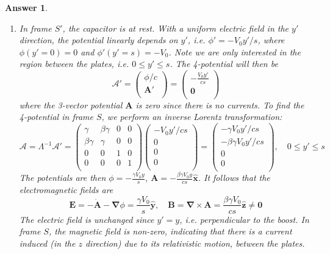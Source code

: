 \documentclass[a4paper]{article}
\newtheorem{ans}{Answer}
\theoremstyle{new}
\begin{document}
\begin{ans}\leavevmode
\begin{enumerate}[label=(\roman*)]
\item In frame $S'$, the capacitor is at rest. With a uniform electric field in the $y'$ direction, the potential linearly depends on $y'$, i.e. $\phi'=-V_0y'/s$, where $\phi(y'=0)=0$ and $\phi'(y'=s)=-V_0$. Note we are only interested in the region between the plates, i.e. $0\leq y'\leq s$. The 4-potential will then be
$$\mathcal{A}'=\begin{pmatrix}\phi/c\\\mathbf{A'}\\\end{pmatrix}=\begin{pmatrix}-\frac{V_0y'}{cs}\\\boldsymbol{0}\\\end{pmatrix}$$
where the 3-vector potential $\mathbf{A}$ is zero since there is no currents. To find the 4-potential in frame $S$, we perform an inverse Lorentz transformation:
$$\mathcal{A}=\Lambda^{-1}\mathcal{A}'=\begin{pmatrix}\gamma&\beta\gamma&0&0\\\beta\gamma&\gamma&0&0\\0&0&1&0\\0&0&0&1\\\end{pmatrix}\begin{pmatrix}-V_0y'/cs\\0\\0\\0\\\end{pmatrix}=\begin{pmatrix}-\gamma V_0y'/cs\\-\beta\gamma V_0y'/cs\\0\\0\\\end{pmatrix},\quad 0\leq y'\leq s$$
The potentials are then $\phi=-\frac{\gamma V_0y}{s},~\mathbf{A}=-\frac{\beta\gamma V_0y}{cs}\mathbf{\hat{x}}$. It follows that the electromagnetic fields are
$$\mathbf{E}=-\mathbf{\dot{A}}-\boldsymbol{\nabla}\phi=\frac{\gamma V_0}{s}\mathbf{\hat{y}},\quad\mathbf{B}=\boldsymbol{\nabla}\times\mathbf{A}=\frac{\beta\gamma V_0}{cs}\mathbf{\hat{z}}\neq\boldsymbol{0}$$
The electric field is unchanged since $y'=y$, i.e. perpendicular to the boost. In frame $S$, the magnetic field is non-zero, indicating that there is a current induced (in the $z$ direction) due to its relativistic motion, between the plates.

\end{enumerate}
\end{ans}
\end{document}
